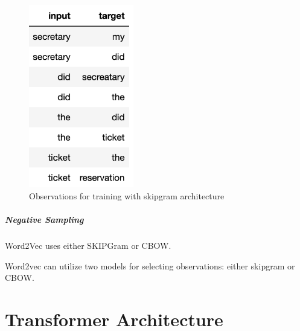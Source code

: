\begin{figure}[ht]
	\centering
	\includegraphics[height=8cm]{Bilder/word2vec/skipgram.png}
	\caption{Observations for training with skipgram architecture}
	
\end{figure}


\subparagraph{Negative Sampling}


Word2Vec uses either SKIPGram or CBOW.

Word2vec can utilize two models for selecting observations: either skipgram or \ac{CBOW}. 

\newpage
\section{Transformer Architecture}

